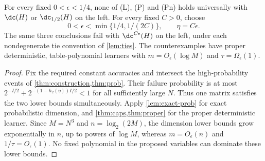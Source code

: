 \begin{corollary}\label{cor:negative-answer}
For every fixed $0<\epsilon<1/4$, none of (L), (P) and (Pn) holds universally with $\dc(H)$ or $\dc_{1/2}(H)$ on the left. For every fixed $C>0$, choose
\[
 0<\epsilon<\min\{1/4,1/(2C)\},\qquad\eta=C\epsilon.
\]
The same three conclusions fail with $\dc^{C\epsilon}(H)$ on the left, under each nondegenerate tie convention of \cref{lem:ties}. The counterexamples have proper deterministic, table-polynomial learners with $m=O_\epsilon(\log M)$ and $\tau=\Omega_\epsilon(1)$.
\end{corollary}

\begin{proof}
Fix the required constant accuracies and intersect the high-probability events of \cref{thm:construction,thm:prob}. Their failure probability is at most $2^{-I/2}+2^{-(1-h_2(\eta))I/2}<1$ for all sufficiently large $N$. Thus one matrix satisfies the two lower bounds simultaneously. Apply \cref{lem:exact-prob} for exact probabilistic dimension, and \cref{thm:caps,thm:proper} for the proper deterministic learner. Since $M=N^3$ and $n=\log_2(2M)$, the dimension lower bounds grow exponentially in $n$, up to powers of $\log M$, whereas $m=O_\epsilon(n)$ and $1/\tau=O_\epsilon(1)$. No fixed polynomial in the proposed variables can dominate these lower bounds.
\end{proof}
